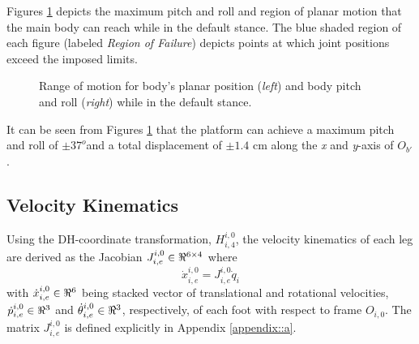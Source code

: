			Figures \ref{fig::pos_and_ori_rom} depicts the maximum pitch and roll and region of planar motion that the main body can reach while in the default stance. The blue shaded region of each figure (labeled \emph{Region of Failure}) depicts points at which joint positions exceed the imposed limits.
			\begin{figure}[h!]
				\centering
				\caption{Range of motion for body's planar position (\emph{left}) and body pitch and roll (\emph{right}) while in the default stance.}
				\label{fig::pos_and_ori_rom}
			\end{figure}
			It can be seen from Figures \ref{fig::pos_and_ori_rom} that the platform can achieve a maximum pitch and roll of  $\pm37^o$and a total displacement of $\pm 1.4 \text{ cm}$ along the \emph{x} and \emph{y}-axis of $O_{b'}$.


		\subsection{Velocity Kinematics}

			Using the DH-coordinate transformation, ${H}^{i,0}_{i,4}$, the velocity kinematics of each \Ith leg are derived as the Jacobian $J^{i,0}_{i,e} \in\Re^{6\times4}$ where 
				\begin{equation}
					\dot{x}^{i,0}_{i,e} = J^{i,0}_{i,e}  \dot{q}_{i}
					\label{eq::leg_jacobian}
				\end{equation}
			with $\dot{x}^{i,0}_{i,e} \in\Re^{6}$ being stacked vector of translational and rotational velocities, $\dot{p}_{i,e}^{i,0} \in\Re^{3}$ and $\dot{\theta}_{i,e}^{i,0}\in\Re^{3}$, respectively, of each \Ith foot with respect to frame $O_{i,0}$. The matrix $J^{i,0}_{i,e}$ is defined explicitly in Appendix \ref{appendix::a}.

